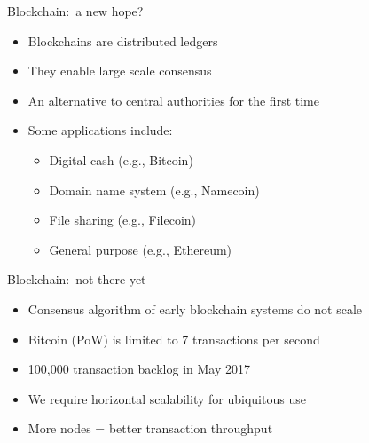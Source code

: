 \documentclass{beamer}
\begin{document}
\begin{frame}{Blockchain:~a new hope?}
  \begin{itemize}
    \item Blockchains are distributed ledgers
    \item They enable large scale consensus
    \item An alternative to central authorities for the first time
    \item Some applications include:
    \begin{itemize}
      \item Digital cash (e.g., Bitcoin)
      \item Domain name system (e.g., Namecoin)
      \item File sharing (e.g., Filecoin)
      \item General purpose (e.g., Ethereum)
    \end{itemize}
  \end{itemize}
\end{frame}

\begin{frame}{Blockchain:~not there yet}
  \begin{itemize}
    \item Consensus algorithm of early blockchain systems do not scale
    \item Bitcoin (PoW) is limited to 7 transactions per second
    \item 100,000 transaction backlog in May 2017
    \item We require horizontal scalability for ubiquitous use
    \item More nodes = better transaction throughput
  \end{itemize}
\end{frame}
\end{document}
